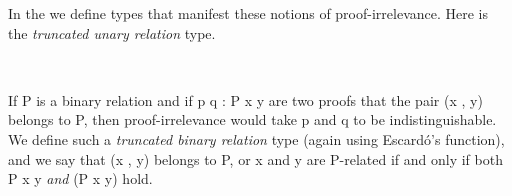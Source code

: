 \documentclass[a4paper,UKenglish,cleveref,autoref,thm-restate,11pt]{lipics-v2021}
\begin{document}
In the \ualib we define types that manifest these notions of proof-irrelevance. Here is the \emph{truncated unary relation} type.
\ccpad
\begin{code}%
\>[0][@{}l@{\AgdaIndent{1}}]%
\>[1]\AgdaSpace{}%
\AgdaSymbol{:}\AgdaSpace{}%
\AgdaSpace{}%
\AgdaSpace{}%
\AgdaSpace{}%
\AgdaSymbol{(}\AgdaSpace{}%
\AgdaSymbol{:}\AgdaSpace{}%
\AgdaSymbol{)}\AgdaSpace{}%
\AgdaSpace{}%
\AgdaSpace{}%
\AgdaSpace{}%
\AgdaSpace{}%
%
\<%
\\
%
\>[1]\AgdaSpace{}%
\AgdaSpace{}%
\AgdaSpace{}%
\AgdaSymbol{=}\AgdaSpace{}%
\AgdaSpace{}%
\AgdaSpace{}%
\AgdaSpace{}%
\AgdaSymbol{(}\AgdaSpace{}%
\AgdaSpace{}%
\AgdaSpace{}%
\AgdaSymbol{)}\AgdaSpace{}%
\AgdaFunction{,}\AgdaSpace{}%
\AgdaSpace{}%
\AgdaSpace{}%
\AgdaSpace{}%
\AgdaSpace{}%
\AgdaSymbol{(}\AgdaSpace{}%
\AgdaSymbol{)}\<%
\end{code}
\ccpad
If \af P is a binary relation and if \ab p \ab q \as : \af P \ab x \ab y are two proofs that the pair (\ab x , \ab y) belongs to \af P, then proof-irrelevance would take \ab p and \ab q to be indistinguishable. We define such a \emph{truncated binary relation} type (again using Escard\'o's  function), and we say that (\ab x , \ab y) belongs to \af P, or \ab x and \ab y are \af P-related if and only if both \af P \ab x \ab y \textit{and}  (\af P \ab x \ab y) hold.
\ccpad
\begin{code}%
\>[1]\AgdaSpace{}%
\AgdaSymbol{:}\AgdaSpace{}%
\AgdaSpace{}%
\AgdaSpace{}%
\AgdaSpace{}%
\AgdaSymbol{(}\AgdaSpace{}%
\AgdaSymbol{:}\AgdaSpace{}%
\AgdaSymbol{)}\AgdaSpace{}%
\AgdaSpace{}%
\AgdaSpace{}%
\AgdaSpace{}%
\AgdaSpace{}%
%
\<%
\\
%
\>[1]\AgdaSpace{}%
\AgdaSpace{}%
\AgdaSpace{}%
\AgdaSymbol{=}\AgdaSpace{}%
\AgdaSpace{}%
\AgdaSpace{}%
\AgdaSpace{}%
\AgdaSymbol{(}\AgdaSpace{}%
\AgdaSpace{}%
\AgdaSpace{}%
\AgdaSpace{}%
\AgdaSpace{}%
\AgdaSymbol{)}\AgdaSpace{}%
\AgdaFunction{,}\AgdaSpace{}%
\AgdaSpace{}%
\AgdaSpace{}%
\AgdaSpace{}%
\AgdaSpace{}%
\AgdaSpace{}%
\AgdaSymbol{(}\AgdaSpace{}%
\AgdaSpace{}%
\AgdaSymbol{)}\<%
\end{code}
\ccpad
\end{document}
